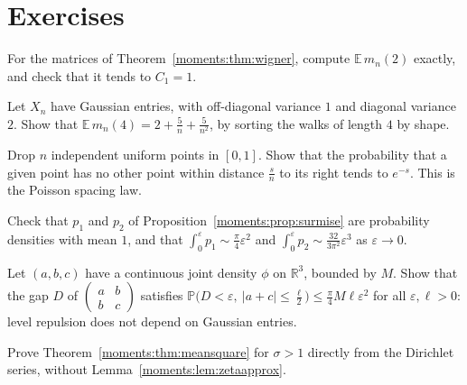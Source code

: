 \section{Exercises}

\begin{exercise}[$\star$]\label{moments:ex:trace2}
For the matrices of Theorem~\ref{moments:thm:wigner}, compute $\mathbb E\,m_n(2)$ exactly, and check that it tends to $C_1=1$.
\end{exercise}

\begin{exercise}[$\star\star$]\label{moments:ex:trace4}
Let $X_n$ have Gaussian entries, with off-diagonal variance $1$ and diagonal variance $2$. Show that $\mathbb E\,m_n(4)=2+\frac5n+\frac5{n^2}$, by sorting the walks of
length $4$ by shape.
\end{exercise}

\begin{exercise}[$\star$]\label{moments:ex:poissonsp}
Drop $n$ independent uniform points in $[0,1]$. Show that the probability that a given point has no other point within distance $\frac sn$ to its right
tends to $e^{-s}$. This is the Poisson spacing law.
\end{exercise}

\begin{exercise}[$\star$]\label{moments:ex:surmisemean}
Check that $p_1$ and $p_2$ of Proposition~\ref{moments:prop:surmise} are probability densities with mean $1$, and that $\int_0^\varepsilon p_1\sim\frac\pi4\varepsilon^2$ and
$\int_0^\varepsilon p_2\sim\frac{32}{3\pi^2}\varepsilon^3$ as $\varepsilon\to0$.
\end{exercise}

\begin{exercise}[$\star\star$]\label{moments:ex:repulsion}
Let $(a,b,c)$ have a continuous joint density $\phi$ on $\mathbb R^3$, bounded by $M$. Show that the gap $D$ of $\begin{pmatrix}a&b\\b&c\end{pmatrix}$
satisfies $\mathbb P\bigl(D<\varepsilon,\ |a+c|\le\frac\ell2\bigr)\le\frac\pi4M\ell\varepsilon^2$ for all $\varepsilon,\ell>0$: level repulsion does not depend
on Gaussian entries.
\end{exercise}

\begin{exercise}[$\star$]\label{moments:ex:sigmagt1}
Prove Theorem~\ref{moments:thm:meansquare} for $\sigma>1$ directly from the Dirichlet series, without Lemma~\ref{moments:lem:zetaapprox}.
\end{exercise}

